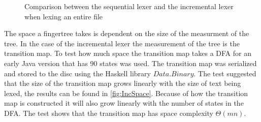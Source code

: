 \begin{figure}[!h]
\caption{Comparison between the sequential lexer and the incremental lexer when
         lexing an entire file\label{fig:IncNewTime}}
\end{figure}

The space a fingertree takes is dependent on the size of the measurment of the
tree. In the case of the incremental lexer the measurement of the tree is the
transition map. To test how much space the transition map takes a DFA for an
early Java version that has 90 states was used. The transition map was
serialized and stored to the disc using the Haskell library $Data.Binary$. The
test suggested that the size of the transition map grows linearly with the size
of text being lexed, the results can be found in \cref{fig:IncSpace}. Because of
how the transition map is constructed it will also grow linearly with the number
of states in the DFA. The test shows that the transition map has space
complexity $\Theta(mn)$.

